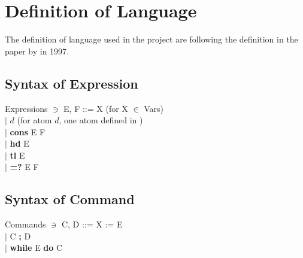 \chapter{Definition of \WHILE Language}
The definition of \WHILE language used in the project are following the definition in the paper  by  in 1997\cite{jones_computability_1997}.
\section{Syntax of Expression}\label{appendix:syntax of expression}
Expressions \hspace{0.3cm}$\ni$\hspace{0.3cm} E, F\hspace{0.1cm} ::= X \hspace{0.98cm}(for X $\in$ Vars)\\
\indent\hspace{4.2cm}$|$ $d$\hspace{1cm} (for atom $d$, one atom  defined in \Agda)\\
\indent\hspace{4.2cm}$|$ \textbf{cons} E F\\
\indent\hspace{4.2cm}$|$ \textbf{hd} E\\
\indent\hspace{4.2cm}$|$ \textbf{tl} E\\
\indent\hspace{4.2cm}$|$ \textbf{=?} E F\\
\section{Syntax of Command}\label{appendix:syntax of command}
Commands \hspace{0.35cm}$\ni$\hspace{0.35cm} C, D\hspace{0.1cm} ::= X := E\\
\indent\hspace{4.2cm}$|$ C \textbf{;} D\\
\indent\hspace{4.2cm}$|$ \textbf{while} E \textbf{do} C\\
